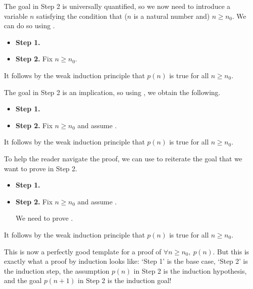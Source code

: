 The goal in Step 2 is universally quantified, so we now need to introduce a variable $n$ satisfying the condition that ($n$ is a natural number and) $n \ge n_0$. We can do so using .

\begin{snippet}
\begin{itemize}
\item \textbf{Step 1.} 
\item \textbf{Step 2.} Fix $n \ge n_0$. 
\end{itemize}

It follows by the weak induction principle that $p(n)$ is true for all $n \ge n_0$.
\end{snippet}

The goal in Step 2 is an implication, so using , we obtain the following.

\begin{snippet}
\begin{itemize}
\item \textbf{Step 1.} 
\item \textbf{Step 2.} Fix $n \ge n_0$ and assume .

\end{itemize}

It follows by the weak induction principle that $p(n)$ is true for all $n \ge n_0$.
\end{snippet}

To help the reader navigate the proof, we can use  to reiterate the goal that we want to prove in Step 2.

\begin{snippet}
\begin{itemize}
\item \textbf{Step 1.} 
\item \textbf{Step 2.} Fix $n \ge n_0$ and assume . 

We need to prove .

\end{itemize}

It follows by the weak induction principle that $p(n)$ is true for all $n \ge n_0$.
\end{snippet}

This is now a perfectly good template for a proof of $\forall n \ge n_0,~ p(n)$. But this is exactly what a proof by induction looks like: `Step 1' is the base case, `Step 2' is the induction step, the assumption $p(n)$ in Step 2 is the induction hypothesis, and the goal $p(n+1)$ in Step 2 is the induction goal!